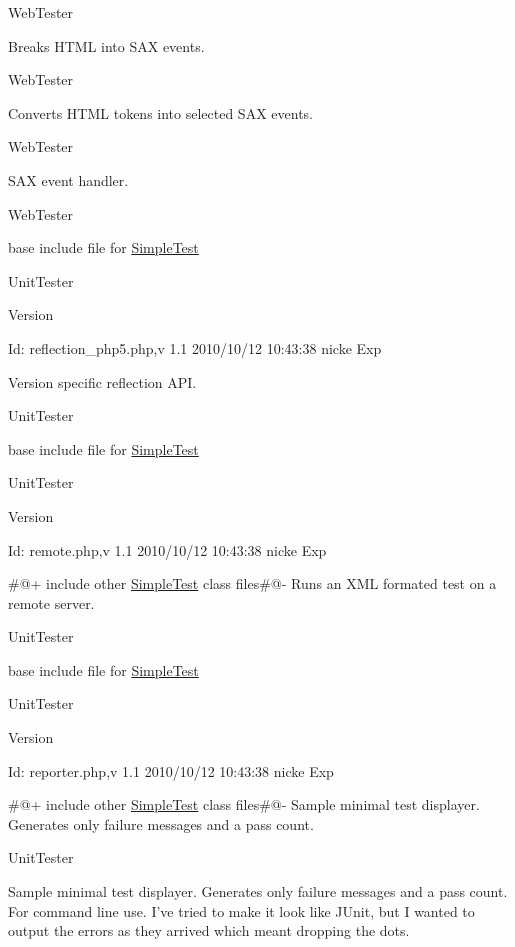 WebTester

Breaks HTML into SAX events.

WebTester

Converts HTML tokens into selected SAX events.

WebTester

SAX event handler.

WebTester 

base include file for \hyperlink{class_simple_test}{SimpleTest}

UnitTester \begin{DoxyVersion}{Version}

\end{DoxyVersion}
\begin{DoxyParagraph}{Id:}
reflection\_\-php5.php,v 1.1 2010/10/12 10:43:38 nicke Exp 
\end{DoxyParagraph}


Version specific reflection API.

UnitTester

base include file for \hyperlink{class_simple_test}{SimpleTest}

UnitTester \begin{DoxyVersion}{Version}

\end{DoxyVersion}
\begin{DoxyParagraph}{Id:}
remote.php,v 1.1 2010/10/12 10:43:38 nicke Exp 
\end{DoxyParagraph}


\#@+ include other \hyperlink{class_simple_test}{SimpleTest} class files\#@-\/ Runs an XML formated test on a remote server.

UnitTester

base include file for \hyperlink{class_simple_test}{SimpleTest}

UnitTester \begin{DoxyVersion}{Version}

\end{DoxyVersion}
\begin{DoxyParagraph}{Id:}
reporter.php,v 1.1 2010/10/12 10:43:38 nicke Exp 
\end{DoxyParagraph}


\#@+ include other \hyperlink{class_simple_test}{SimpleTest} class files\#@-\/ Sample minimal test displayer. Generates only failure messages and a pass count.

UnitTester

Sample minimal test displayer. Generates only failure messages and a pass count. For command line use. I've tried to make it look like JUnit, but I wanted to output the errors as they arrived which meant dropping the dots.

